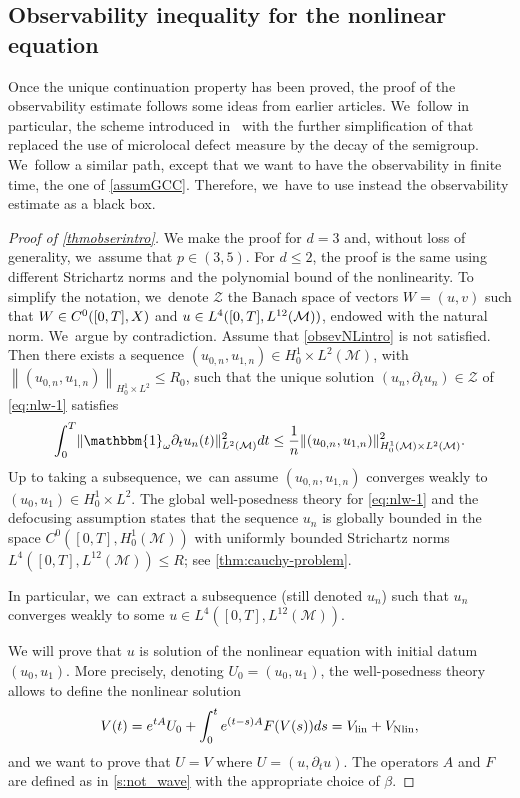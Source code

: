 \documentclass[JEP,XML,SOM,Unicode,published]{cedram}
\newcommand{\lin}{\textup{lin}}
\newcommand{\Nlin}{\textup{Nlin}}
\theoremstyle{definition}
\let\mc\mathcal
\newcommand{\M}{\mc{M}}
\providecommand{\norm}[1]{\lVert#1\rVert}
\newcommand\nor[2]{\left\|#1\right\|_{#2}}
\begin{document}
\subsection{Observability inequality for the nonlinear equation}
Once the unique continuation property has been proved, the proof of the observability estimate follows some ideas from earlier articles. We~follow in particular, the scheme introduced in~\cite{DLZ03} with the further simplification of \cite{JL13} that replaced the use of microlocal defect measure by the decay of the semigroup. We~follow a similar path, except that we want to have the observability in finite time, the one of \ref{assumGCC}. Therefore, we~have to use instead the observability estimate as a black box.
\begin{proof}[Proof of \cref{thmobserintro}]We make the proof for $d=3$ and, without loss of generality, we~assume that $p\in (3,5)$. For $d\leq 2$, the proof is the same using different Strichartz norms and the polynomial bound of the nonlinearity. To simplify the notation, we~denote $\mc{Z}$ the Banach space of vectors $W=(u,v)$ such that $W\in\nobreak C^0([0, T],X)$ and $u\in\nobreak L^{4}([0, T],L^{12}(\M))$, endowed with the natural norm. We~argue by contradiction. Assume that \eqref{obsevNLintro} is not satisfied. Then there exists a sequence \hbox{$(u_{0,n},u_{1,n})\in H^1_0\times L^2(\M)$}, with $\nor{(u_{0,n},u_{1,n})}{H^1_0\times L^2}\leq R_0$, such that the unique solution $(u_{n}, \partial_t u_{n})\in \mc{Z}$ of \eqref{eq:nlw-1} satisfies
\begin{align}\label{obsevNLintronegation}
\int_0^T \norm{\mathbbm{1}_\omega\partial_t u_{n}(t)}_{L^2(\M)}^2 dt
\leq \frac{1}{n}\norm{(u_{0,n},u_{1,n})}_{H_0^1(\M)\times L^2(\M)}^2.
\end{align}
Up to taking a subsequence, we~can assume $(u_{0,n},u_{1,n}) $ converges weakly to $(u_{0},u_{1})\in H^1_0\times L^2$. The global well-posedness theory for \eqref{eq:nlw-1} and the defocusing assumption states that the sequence $u_{n}$ is globally bounded in the space $C^{0}([0, T], H_0^1(\M))$ with uniformly bounded Strichartz norms $L^{4}([0, T], L^{12}(\M))\leq R$; see \cref{thm:cauchy-problem}.

In particular, we~can extract a subsequence (still denoted $u_{n}$) such that $u_{n}$ converges weakly to some $u\in L^{4}([0, T],L^{12}(\M))$.

We will prove that $u$ is solution of the nonlinear equation with initial datum $(u_{0},u_{1})$. More precisely, denoting $U_0=(u_{0},u_{1})$, the well-posedness theory allows to define the nonlinear solution
\begin{align*}
V(t)=e^{tA}U_0+\int_0^t e^{(t-s)A}F(V(s))ds=V_{\lin}+V_{\Nlin},
\end{align*}
and we want to prove that $U=V$ where $U=(u,\partial_{t }u)$. The operators $A$ and $F$ are defined as in \cref{s:not_wave} with the appropriate choice of $\beta$.


\end{proof}
\end{document}
